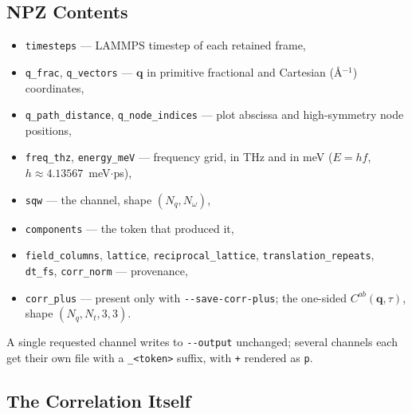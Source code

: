 \documentclass[12pt, a4paper, oneside]{article}
\newcommand{\qvec}{\mathbf{q}}
\newcommand{\Nt}{N_t}
\newcommand{\Nq}{N_q}
\newcommand{\Nw}{N_\omega}
\begin{document}
\subsection{NPZ Contents}

\begin{itemize}
    \item \texttt{timesteps} --- LAMMPS timestep of each retained frame,
    \item \texttt{q\_frac}, \texttt{q\_vectors} --- $\qvec$ in primitive fractional and Cartesian (\AA$^{-1}$) coordinates,
    \item \texttt{q\_path\_distance}, \texttt{q\_node\_indices} --- plot abscissa and high-symmetry node positions,
    \item \texttt{freq\_thz}, \texttt{energy\_meV} --- frequency grid, in THz and in meV ($E = hf$, $h \approx 4.13567$~meV$\cdot$ps),
    \item \texttt{sqw} --- the channel, shape $(\Nq,\Nw)$,
    \item \texttt{components} --- the token that produced it,
    \item \texttt{field\_columns}, \texttt{lattice}, \texttt{reciprocal\_lattice}, \texttt{translation\_repeats}, \texttt{dt\_fs}, \texttt{corr\_norm} --- provenance,
    \item \texttt{corr\_plus} --- present only with \texttt{-\/-save-corr-plus}; the one-sided $C^{ab}(\qvec,\tau)$, shape $(\Nq,\Nt,3,3)$.
\end{itemize}

A single requested channel writes to \texttt{-\/-output} unchanged; several
channels each get their own file with a \texttt{\_<token>} suffix, with
\texttt{+} rendered as \texttt{p}.

\subsection{The Correlation Itself}
\end{document}
